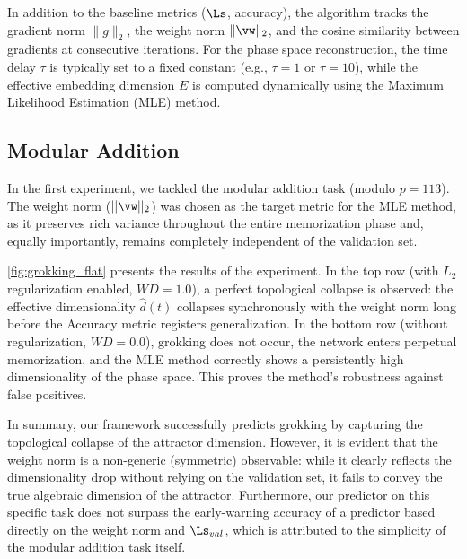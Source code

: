 \documentclass{article}
\begin{document}
In addition to the baseline metrics ($\Ls$, accuracy), the algorithm tracks the gradient norm $\|g\|_2$, the weight norm $\|\vw\|_2$, and the cosine similarity between gradients at consecutive iterations. For the phase space reconstruction, the time delay $\tau$ is typically set to a fixed constant (e.g., $\tau=1$ or $\tau=10$), while the effective embedding dimension $E$ is computed dynamically using the Maximum Likelihood Estimation (MLE) method.

\subsection{Modular Addition}\label{sec:exp_mod}

In the first experiment, we tackled the modular addition task (modulo $p=113$). The weight norm ($||\vw||_2$) was chosen as the target metric for the MLE method, as it preserves rich variance throughout the entire memorization phase and, equally importantly, remains completely independent of the validation set.

\cref{fig:grokking_flat} presents the results of the experiment. In the top row (with $L_2$ regularization enabled, $WD=1.0$), a perfect topological collapse is observed: the effective dimensionality $\hat{d}(t)$ collapses synchronously with the weight norm long before the Accuracy metric registers generalization. In the bottom row (without regularization, $WD=0.0$), grokking does not occur, the network enters perpetual memorization, and the MLE method correctly shows a persistently high dimensionality of the phase space. This proves the method's robustness against false positives.

In summary, our framework successfully predicts grokking by capturing the topological collapse of the attractor dimension. However, it is evident that the weight norm is a non-generic (symmetric) observable: while it clearly reflects the dimensionality drop without relying on the validation set, it fails to convey the true algebraic dimension of the attractor. Furthermore, our predictor on this specific task does not surpass the early-warning accuracy of a predictor based directly on the weight norm and $\Ls_{val}$, which is attributed to the simplicity of the modular addition task itself.
\end{document}
